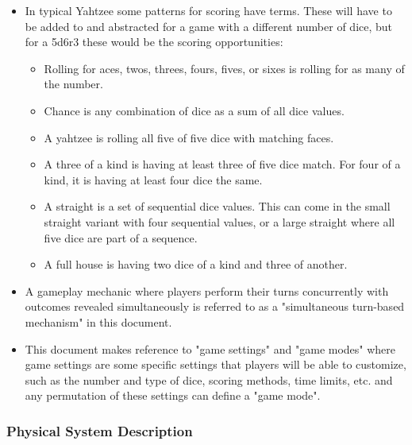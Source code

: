 \begin{itemize}
\item In typical Yahtzee some patterns for scoring have terms. These will have to be added to and abstracted for a game with a different number of dice, but for a 5d6r3 these would be the scoring opportunities:
\begin{itemize}
	\item Rolling for aces, twos, threes, fours, fives, or sixes is rolling for as many of the number.
	\item Chance is any combination of dice as a sum of all dice values.
	\item A yahtzee is rolling all five of five dice with matching faces.
	\item A three of a kind is having at least three of five dice match. For four of a kind, it is having at least four dice the same.
	\item A straight is a set of sequential dice values. This can come in the small straight variant with four sequential values, or a large straight where all five dice are part of a sequence.
	\item A full house is having two dice of a kind and three of another.
\end{itemize}

\item A gameplay mechanic where players perform their turns concurrently with outcomes revealed simultaneously is referred to as a "simultaneous turn-based mechanism" in this document.

\item This document makes reference to "game settings" and "game modes" where game settings are some specific settings that players will be able to customize, such as the number and type of dice, scoring methods, time limits, etc. and any permutation of these settings can define a "game mode".
\end{itemize}

\iffalse
\subsubsection{Physical System Description} \label{sec_phySystDescrip}


